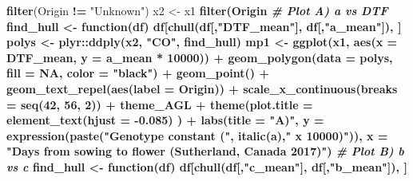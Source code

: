\documentclass[
]{article}
\newenvironment{Shaded}{\begin{snugshade}}{\end{snugshade}}
\newcommand{\CommentTok}[1]{\textcolor[rgb]{0.56,0.35,0.01}{\textit{#1}}}
\newcommand{\ControlFlowTok}[1]{\textcolor[rgb]{0.13,0.29,0.53}{\textbf{#1}}}
\newcommand{\DataTypeTok}[1]{\textcolor[rgb]{0.13,0.29,0.53}{#1}}
\newcommand{\DecValTok}[1]{\textcolor[rgb]{0.00,0.00,0.81}{#1}}
\newcommand{\FloatTok}[1]{\textcolor[rgb]{0.00,0.00,0.81}{#1}}
\newcommand{\KeywordTok}[1]{\textcolor[rgb]{0.13,0.29,0.53}{\textbf{#1}}}
\newcommand{\NormalTok}[1]{#1}
\newcommand{\OperatorTok}[1]{\textcolor[rgb]{0.81,0.36,0.00}{\textbf{#1}}}
\newcommand{\OtherTok}[1]{\textcolor[rgb]{0.56,0.35,0.01}{#1}}
\newcommand{\StringTok}[1]{\textcolor[rgb]{0.31,0.60,0.02}{#1}}
\begin{document}
\begin{Shaded}
\begin{Highlighting}[]
{{{{{{{{\StringTok{  }\KeywordTok{filter}\NormalTok{(Origin }\OperatorTok{!=}\StringTok{ "Unknown"}\NormalTok{)}
\NormalTok{x2 <-}\StringTok{ }\NormalTok{x1 }\OperatorTok{%
\StringTok{  }\KeywordTok{filter}\NormalTok{(Origin }\OperatorTok{%
\CommentTok{# Plot A) a vs DTF}
\NormalTok{find_hull <-}\StringTok{ }\ControlFlowTok{function}\NormalTok{(df) df[}\KeywordTok{chull}\NormalTok{(df[,}\StringTok{"DTF_mean"}\NormalTok{], df[,}\StringTok{"a_mean"}\NormalTok{]), ]}
\NormalTok{polys <-}\StringTok{ }\NormalTok{plyr}\OperatorTok{::}\KeywordTok{ddply}\NormalTok{(x2, }\StringTok{"CO"}\NormalTok{, find_hull)}
\NormalTok{mp1 <-}\StringTok{ }\KeywordTok{ggplot}\NormalTok{(x1, }\KeywordTok{aes}\NormalTok{(}\DataTypeTok{x =}\NormalTok{ DTF_mean, }\DataTypeTok{y =}\NormalTok{ a_mean }\OperatorTok{*}\StringTok{ }\DecValTok{10000}\NormalTok{)) }\OperatorTok{+}\StringTok{ }
\StringTok{  }\KeywordTok{geom_polygon}\NormalTok{(}\DataTypeTok{data =}\NormalTok{ polys, }\DataTypeTok{fill =} \OtherTok{NA}\NormalTok{, }\DataTypeTok{color =} \StringTok{"black"}\NormalTok{) }\OperatorTok{+}
\StringTok{  }\KeywordTok{geom_point}\NormalTok{() }\OperatorTok{+}\StringTok{ }\KeywordTok{geom_text_repel}\NormalTok{(}\KeywordTok{aes}\NormalTok{(}\DataTypeTok{label =}\NormalTok{ Origin)) }\OperatorTok{+}
\StringTok{  }\KeywordTok{scale_x_continuous}\NormalTok{(}\DataTypeTok{breaks =} \KeywordTok{seq}\NormalTok{(}\DecValTok{42}\NormalTok{, }\DecValTok{56}\NormalTok{, }\DecValTok{2}\NormalTok{)) }\OperatorTok{+}\StringTok{ }
\StringTok{  }\NormalTok{theme_AGL }\OperatorTok{+}
\StringTok{  }\KeywordTok{theme}\NormalTok{(}\DataTypeTok{plot.title =} \KeywordTok{element_text}\NormalTok{(}\DataTypeTok{hjust =} \FloatTok{-0.085}\NormalTok{) ) }\OperatorTok{+}
\StringTok{  }\KeywordTok{labs}\NormalTok{(}\DataTypeTok{title =} \StringTok{"A)"}\NormalTok{,}
       \DataTypeTok{y =} \KeywordTok{expression}\NormalTok{(}\KeywordTok{paste}\NormalTok{(}\StringTok{"Genotype constant ("}\NormalTok{, }\KeywordTok{italic}\NormalTok{(a),}\StringTok{" x 10000)"}\NormalTok{)), }
       \DataTypeTok{x =} \StringTok{"Days from sowing to flower (Sutherland, Canada 2017)"}\NormalTok{)}
\CommentTok{# Plot B) b vs c}
\NormalTok{find_hull <-}\StringTok{ }\ControlFlowTok{function}\NormalTok{(df) df[}\KeywordTok{chull}\NormalTok{(df[,}\StringTok{"c_mean"}\NormalTok{], df[,}\StringTok{"b_mean"}\NormalTok{]), ]}
}}}}}}}}}}
\end{Highlighting}
\end{Shaded}
\end{document}
